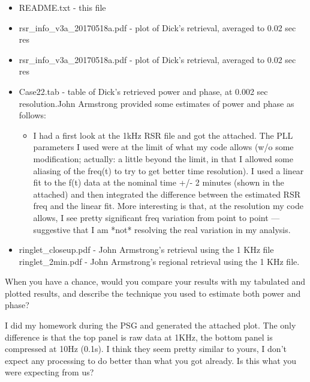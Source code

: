 \documentclass[crop=false,class=article,oneside]{standalone}
\begin{document}
\begin{itemize}
    \item README.txt - this file
    \item rsr\_info\_v3a\_20170518a.pdf - plot of Dick's retrieval, averaged to 0.02 sec res
    \item rsr\_info\_v3a\_20170518a.pdf - plot of Dick's retrieval, averaged to 0.02 sec res
    \item Case22.tab - table of Dick's retrieved power and phase, at 0.002 sec resolution.John Armstrong provided some estimates of power and phase as follows:
    \begin{itemize}
        \item I had a first look at the 1kHz RSR file and got the attached. The PLL parameters I used were at the limit of what my code allows (w/o some modification; actually:  a little beyond the limit, in that I allowed
        some aliasing of the freq(t) to try to get better time resolution).  I
        used a linear fit to the f(t) data at the nominal time +/- 2 minutes (shown in the attached) and then integrated the difference between the estimated RSR freq and the linear fit. More interesting is that, at the resolution my code allows, I see pretty significant freq variation from point to point — suggestive that I am *not* resolving the real variation in my analysis.
    \end{itemize}
    \item ringlet\_closeup.pdf - John Armstrong's retrieval using the 1 KHz file ringlet\_2min.pdf - John Armstrong's regional retrieval using the 1 KHz file.
\end{itemize}
When you have a chance, would you compare your results with my tabulated and plotted results, and describe the technique you used to estimate both power and phase?
\par\hfill\par
I did my homework during the PSG and generated the attached plot. The only difference is that the top panel is raw data at 1KHz, the bottom panel is compressed at 10Hz (0.1s). I think they seem pretty similar to yours, I don’t expect any processing to do better than what you got already. Is this what you were expecting from us?
\par\hfill\par
\end{document}
